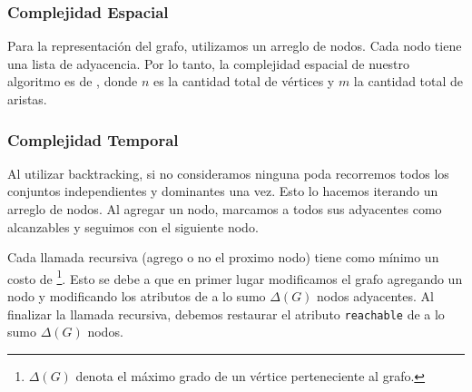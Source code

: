 \begin{algorithmic}

  \EndIf
{}  \EndIf
{}  \EndIf

	\EndIf
\EndFor

\Else
\EndIf

\EndFor


\EndProcedure
\end{algorithmic}

\subsubsection{Complejidad Espacial}
Para la representación del grafo, utilizamos un arreglo de nodos. Cada nodo tiene una lista de adyacencia. Por lo tanto, la complejidad espacial de nuestro algoritmo es de , donde $n$ es la cantidad total de vértices y $m$ la cantidad total de aristas.

\subsubsection{Complejidad Temporal}
Al utilizar backtracking, si no consideramos ninguna poda recorremos todos los conjuntos independientes y dominantes una vez. Esto lo hacemos iterando un arreglo de nodos. Al agregar un nodo, marcamos a todos sus adyacentes como alcanzables y seguimos con el siguiente nodo.

Cada llamada recursiva (agrego o no el proximo nodo) tiene como mínimo un costo de  \footnote{$\Delta(G)$ denota el máximo grado de un vértice perteneciente al grafo.}. Esto se debe a que en primer lugar modificamos el grafo agregando un nodo y modificando los atributos de a lo sumo $\Delta(G)$ nodos adyacentes. Al finalizar la llamada recursiva, debemos restaurar el atributo \texttt{reachable} de a lo sumo $\Delta(G)$ nodos.


